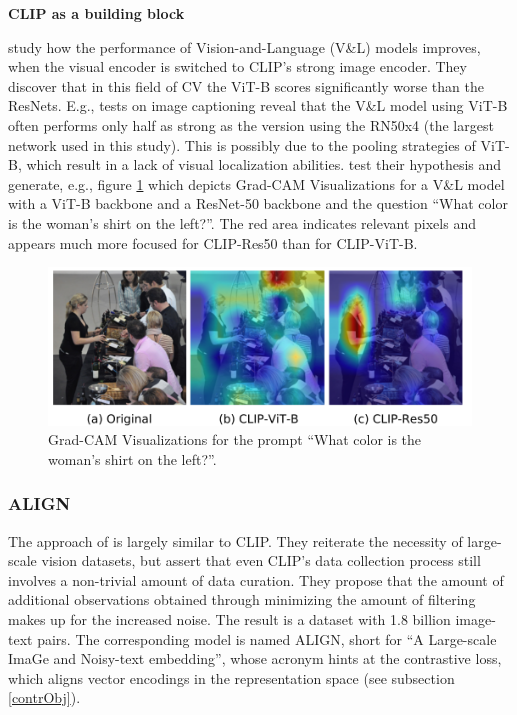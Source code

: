 \documentclass[
]{krantz}
\begin{document}
\textbf{CLIP as a building block}

\citet{shen2021much} study how the performance of Vision-and-Language (V\&L) models improves, when the visual encoder is switched to CLIP's strong image encoder.
They discover that in this field of CV the ViT-B scores significantly worse than the ResNets.
E.g., tests on image captioning reveal that the V\&L model using ViT-B often performs only half as strong as the version using the RN50x4 (the largest network used in this study).
This is possibly due to the pooling strategies of ViT-B, which result in a lack of visual localization abilities.
\citet{shen2021much} test their hypothesis and generate, e.g., figure \ref{fig:attention-ViT} which depicts Grad-CAM Visualizations for a V\&L model with a ViT-B backbone and a ResNet-50 backbone and the question ``What color is the woman's shirt on the left?''.
The red area indicates relevant pixels and appears much more focused for CLIP-Res50 than for CLIP-ViT-B.

\begin{figure}

{\centering \includegraphics[width=1\linewidth]{figures/02-04-text-support-img/attention-of-ViT} 

}

\caption{Grad-CAM Visualizations for the prompt ``What color is the woman's shirt on the left?''.}\label{fig:attention-ViT}
\end{figure}



\hypertarget{align}{%
\subsubsection{ALIGN}\label{align}}

The approach of \citet{jia2021scaling} is largely similar to CLIP.
They reiterate the necessity of large-scale vision datasets, but assert that even CLIP's data collection process still involves a non-trivial amount of data curation.
They propose that the amount of additional observations obtained through minimizing the amount of filtering makes up for the increased noise.
The result is a dataset with 1.8 billion image-text pairs.
The corresponding model is named ALIGN, short for ``A Large-scale ImaGe and Noisy-text embedding'', whose acronym hints at the contrastive loss, which aligns vector encodings in the representation space (see subsection \ref{contrObj}).
\end{document}
